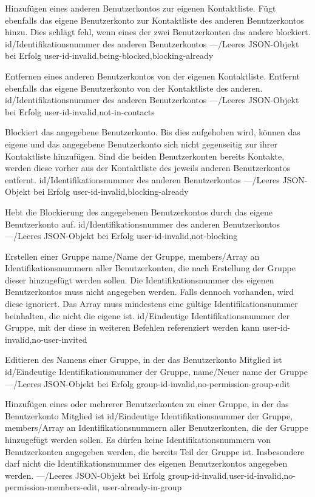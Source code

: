 \documentclass[parskip=full,11pt]{scrartcl}
\begin{document}
{Hinzufügen eines anderen Benutzerkontos zur eigenen Kontaktliste.
Fügt ebenfalls das eigene Benutzerkonto zur Kontaktliste des anderen
Benutzerkontos hinzu.
Dies schlägt fehl, wenn eines der zwei Benutzerkonten das andere blockiert.}
{id/Identifikationsnummer des anderen Benutzerkontos}
{---/Leeres JSON-Objekt bei Erfolg}
{user-id-invalid,being-blocked,blocking-already}

{Entfernen eines anderen Benutzerkontos von der eigenen Kontaktliste.
Entfernt ebenfalls das eigene Benutzerkonto von der Kontaktliste des anderen.}
{id/Identifikationsnummer des anderen Benutzerkontos}
{---/Leeres JSON-Objekt bei Erfolg}
{user-id-invalid,not-in-contacts}

{Blockiert das angegebene Benutzerkonto.
Bis dies aufgehoben wird, können das eigene und das angegebene
Benutzerkonto sich nicht gegenseitig zur ihrer Kontaktliste hinzufügen.
Sind die beiden Benutzerkonten bereits Kontakte, werden diese vorher aus der
Kontaktliste des jeweils anderen Benutzerkontos entfernt.}
{id/Identifikationsnummer des anderen Benutzerkontos}
{---/Leeres JSON-Objekt bei Erfolg}
{user-id-invalid,blocking-already}

{Hebt die Blockierung des angegebenen Benutzerkontos durch das eigene
Benutzerkonto auf.}
{id/Identifikationsnummer des anderen Benutzerkontos}
{---/Leeres JSON-Objekt bei Erfolg}
{user-id-invalid,not-blocking}

{Erstellen einer Gruppe}
{name/Name der Gruppe,
members/Array an Identifikationsnummern aller Benutzerkonten{,} die nach
Erstellung der Gruppe dieser hinzugefügt werden sollen.
Die Identifikationsnummer des eigenen Benutzerkontos muss nicht angegeben
werden.
Falls dennoch vorhanden{,} wird diese ignoriert.
Das Array muss mindestens eine gültige Identifikationsnummer beinhalten{,} die
nicht die eigene ist.}
{id/Eindeutige Identifikationsnummer der Gruppe{,} mit der diese in
weiteren Befehlen referenziert werden kann}
{user-id-invalid,no-user-invited}

{Editieren des Namens einer Gruppe, in der das Benutzerkonto Mitglied ist}
{id/Eindeutige Identifikationsnummer der Gruppe,
name/Neuer name der Gruppe}
{---/Leeres JSON-Objekt bei Erfolg}
{group-id-invalid,no-permission-group-edit}

{Hinzufügen eines oder mehrerer Benutzerkonten zu einer Gruppe, in der das
Benutzerkonto Mitglied ist}
{id/Eindeutige Identifikationsnummer der Gruppe,
members/Array an Identifikationsnummern aller Benutzerkonten{,} die der Gruppe
hinzugefügt werden sollen.
Es dürfen keine Identifikationsnummern von Benutzerkonten angegeben werden{,}
die bereits Teil der Gruppe ist.
Insbesondere darf nicht die Identifikationsnummer des eigenen Benutzerkontos
angegeben werden.}
{---/Leeres JSON-Objekt bei Erfolg}
{group-id-invalid,user-id-invalid,no-permission-members-edit,%
user-already-in-group}
\end{document}
